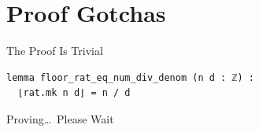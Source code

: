 \documentclass{beamer}
\begin{document}
\section{Proof Gotchas}
\begin{frame}[fragile]{The Proof Is Trivial}
\begin{verbatim}
lemma floor_rat_eq_num_div_denom (n d : ℤ) :
  ⌊rat.mk n d⌋ = n / d
\end{verbatim}

\vspace{10mm}
\end{frame}
\begin{frame}[fragile]{Proving\dots\ Please Wait}
\end{frame}
\end{document}
